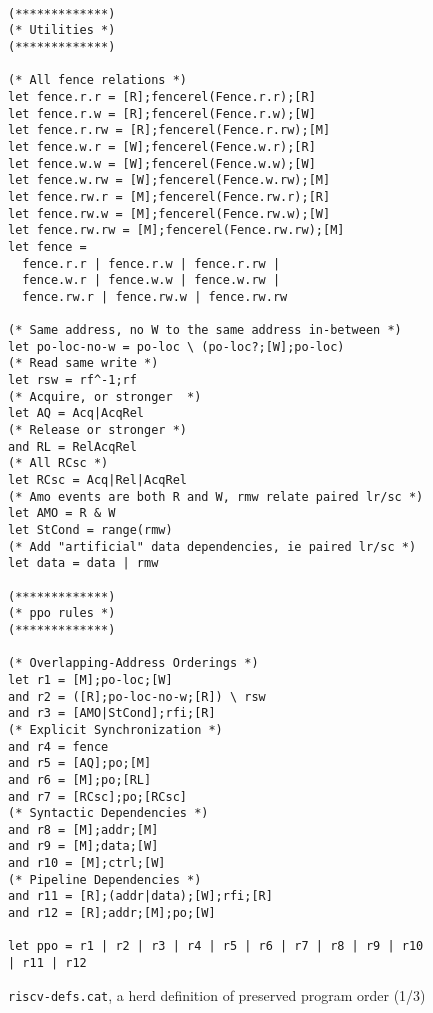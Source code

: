 \begin{figure}[h!]
  {
  \tt\bfseries\centering\footnotesize
  \begin{lstlisting}
(*************)
(* Utilities *)
(*************)

(* All fence relations *)
let fence.r.r = [R];fencerel(Fence.r.r);[R]
let fence.r.w = [R];fencerel(Fence.r.w);[W]
let fence.r.rw = [R];fencerel(Fence.r.rw);[M]
let fence.w.r = [W];fencerel(Fence.w.r);[R]
let fence.w.w = [W];fencerel(Fence.w.w);[W]
let fence.w.rw = [W];fencerel(Fence.w.rw);[M]
let fence.rw.r = [M];fencerel(Fence.rw.r);[R]
let fence.rw.w = [M];fencerel(Fence.rw.w);[W]
let fence.rw.rw = [M];fencerel(Fence.rw.rw);[M]
let fence = 
  fence.r.r | fence.r.w | fence.r.rw |
  fence.w.r | fence.w.w | fence.w.rw |
  fence.rw.r | fence.rw.w | fence.rw.rw

(* Same address, no W to the same address in-between *)
let po-loc-no-w = po-loc \ (po-loc?;[W];po-loc)
(* Read same write *)
let rsw = rf^-1;rf
(* Acquire, or stronger  *)
let AQ = Acq|AcqRel
(* Release or stronger *)
and RL = RelAcqRel
(* All RCsc *)
let RCsc = Acq|Rel|AcqRel
(* Amo events are both R and W, rmw relate paired lr/sc *)
let AMO = R & W
let StCond = range(rmw)
(* Add "artificial" data dependencies, ie paired lr/sc *)
let data = data | rmw

(*************)
(* ppo rules *)
(*************)

(* Overlapping-Address Orderings *)
let r1 = [M];po-loc;[W]
and r2 = ([R];po-loc-no-w;[R]) \ rsw
and r3 = [AMO|StCond];rfi;[R]
(* Explicit Synchronization *)
and r4 = fence
and r5 = [AQ];po;[M]
and r6 = [M];po;[RL]
and r7 = [RCsc];po;[RCsc]
(* Syntactic Dependencies *)
and r8 = [M];addr;[M]
and r9 = [M];data;[W]
and r10 = [M];ctrl;[W]
(* Pipeline Dependencies *)
and r11 = [R];(addr|data);[W];rfi;[R]
and r12 = [R];addr;[M];po;[W]

let ppo = r1 | r2 | r3 | r4 | r5 | r6 | r7 | r8 | r9 | r10 | r11 | r12
\end{lstlisting}
  }
  \caption{{\tt riscv-defs.cat}, a herd definition of preserved program order (1/3)}
  \label{fig:herd1}
\end{figure}

